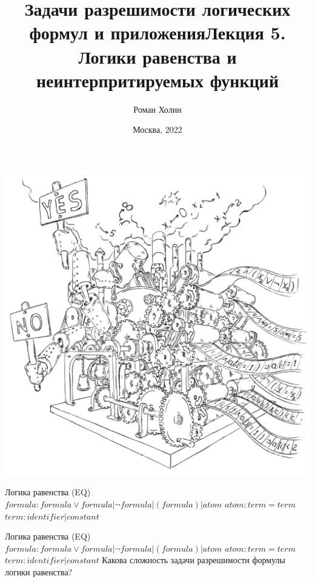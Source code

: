\documentclass{beamer}
\begin{document}
\title{Задачи разрешимости логических формул и приложения\newline Лекция 5. Логики равенства и неинтерпритируемых функций}
\author{Роман Холин}
\date{Москва, 2022}

\begin{frame}
\includegraphics[scale=0.5]{../decision-procedure.png}
\end{frame}

\frame{\titlepage}

\begin{frame}{Логика равенства (EQ)}
$formula: formula \vee formula | \lnot formula | (formula) | atom$\newline
$atom: term = term$\newline
$term: identifier | constant$\newline
\end{frame}

\begin{frame}{Логика равенства (EQ)}
$formula: formula \vee formula | \lnot formula | (formula) | atom$\newline
$atom: term = term$\newline
$term: identifier | constant$\newline
Какова сложность задачи разрешимости формулы логики равенства?\newline
\end{frame}
\end{document}

